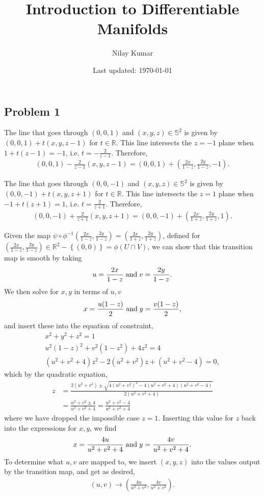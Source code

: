 \documentclass{mathnotes}
\title{Introduction to Differentiable Manifolds}
\author{Nilay Kumar}
\date{Last updated: \today}
\begin{document}
\maketitle

\subsection*{Problem 1}

The line that goes through $(0,0,1)$ and $(x,y,z)\in\mathbb{S}^2$ is given by $(0,0,1)+t(x,y,z-1)$ for $t\in\mathbb{R}$.
This line intersects the $z=-1$ plane when $1+t(z-1)=-1$, i.e. $t=-\frac{2}{z-1}$. Therefore,
\begin{align*}
    (0,0,1)-\frac{2}{z-1}(x,y,z-1)=(0,0,1)+(\frac{2x}{1-z},\frac{2y}{1-z},-1).
\end{align*}

The line that goes through $(0,0,-1)$ and $(x,y,z)\in\mathbb{S}^2$ is given by $(0,0,-1)+t(x,y,z+1)$ for $t\in\mathbb{R}$.
This line intersects the $z=1$ plane when $-1+t(z+1)=1$, i.e. $t=\frac{2}{z+1}$. Therefore,
\begin{align*}
    (0,0,-1)+\frac{2}{z+1}(x,y,z+1)=(0,0,-1)+(\frac{2x}{1+z},\frac{2y}{1+z},1).
\end{align*}

Given the map $\psi\circ\phi^{-1}\left(\frac{2x}{1-z},\frac{2y}{1-z}\right)=\left( \frac{2x}{1+z},\frac{2y}{1+z} \right)$, defined for $\left(\frac{2x}{1-z},\frac{2y}{1-z}\right)\in\mathbb{R}^2-\left\{ \left( 0,0 \right) \right\}=\phi(U\cap V)$,
we can show that this transition map is smooth by taking
\[u=\frac{2x}{1-z} \;\textnormal{and}\; v=\frac{2y}{1-z}.\]
We then solve for $x,y$ in terms of $u,v$
\[x=\frac{u(1-z)}{2} \;\textnormal{and}\; y=\frac{v(1-z)}{2},\]
and insert these into the equation of constraint,
\begin{align*}
    x^2+y^2+z^2=1\\
    u^2(1-z)^2+v^2(1-z^2)+4z^2=4\\
    (u^2+v^2+4)z^2-2(u^2+v^2)z+(u^2+v^2-4)=0,
\end{align*}
which by the quadratic equation,
\begin{align*}
    z&=\frac{2(u^2+v^2)\pm\sqrt{4(u^2+v^2)^2-4(u^2+v^2+4)(u^2+v^2-4)}}{2(u^2+v^2+4)}\\
    &=\frac{u^2+v^2\pm4}{u^2+v^2+4}=\frac{u^2+v^2-4}{u^2+v^2+4}
\end{align*}
where we have dropped the impossible case $z=1$. Inserting this value for $z$ back into the expressions for $x,y$, we find
\begin{align*}
    x=\frac{4u}{u^2+v^2+4} \;\textnormal{and}\; y=\frac{4v}{u^2+v^2+4}.
\end{align*}
To determine what $u, v$ are mapped to, we insert $(x,y,z)$ into the values output by the transition map, and get as desired, 
\begin{align}
    (u,v)\to\left(\frac{4u}{u^2+v^2},\frac{4v}{u^2+v^2}\right).
    \label{eq:1}
\end{align}
\end{document}
